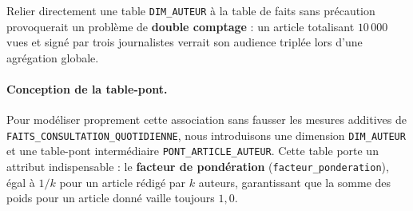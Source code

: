 \documentclass[a4paper,12pt]{article}
\begin{document}
Relier directement une table \texttt{DIM\_AUTEUR} à la table de faits sans précaution provoquerait un problème de \textbf{double comptage} : un article totalisant $10\,000$ vues et signé par trois journalistes verrait son audience triplée lors d'une agrégation globale.

\paragraph{Conception de la table-pont.}
Pour modéliser proprement cette association sans fausser les mesures additives de \texttt{FAITS\_CONSULTATION\_QUOTIDIENNE}, nous introduisons une dimension \texttt{DIM\_AUTEUR} et une table-pont intermédiaire \texttt{PONT\_ARTICLE\_AUTEUR}. Cette table porte un attribut indispensable : le \textbf{facteur de pondération} (\texttt{facteur\_ponderation}), égal à $1/k$ pour un article rédigé par $k$ auteurs, garantissant que la somme des poids pour un article donné vaille toujours $1{,}0$.
\end{document}
